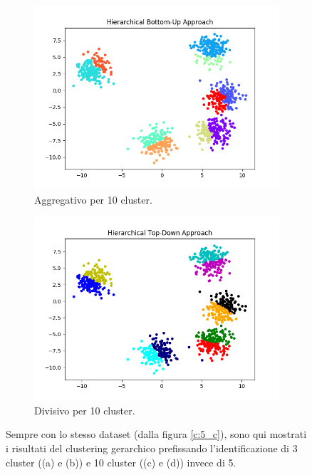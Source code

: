 \documentclass{llncs}
\begin{document}
\begin{figure}[h]
\begin{subfigure}{.5\textwidth}
			\includegraphics[width=\linewidth]{immagini/5_clusters_agg_10.png}
			\caption{Aggregativo per 10 cluster.}
			\label{hier:c}			
		  \end{subfigure}
		  \begin{subfigure}{.5\textwidth}
			\centering
			\includegraphics[width=\linewidth]{immagini/5_clusters_div_10.png}
			\caption{Divisivo per 10 cluster.}
			\label{hier:d}			
		  \end{subfigure}
		\caption{Sempre con lo stesso dataset (dalla figura \ref{c:5_c}), sono qui mostrati i risultati del clustering gerarchico prefissando
		l'identificazione di 3 cluster ((a) e (b)) e 10 cluster ((c) e (d)) invece di 5.}
		\label{hier:test}
	\end{figure}
	\clearpage
	
\end{document}
